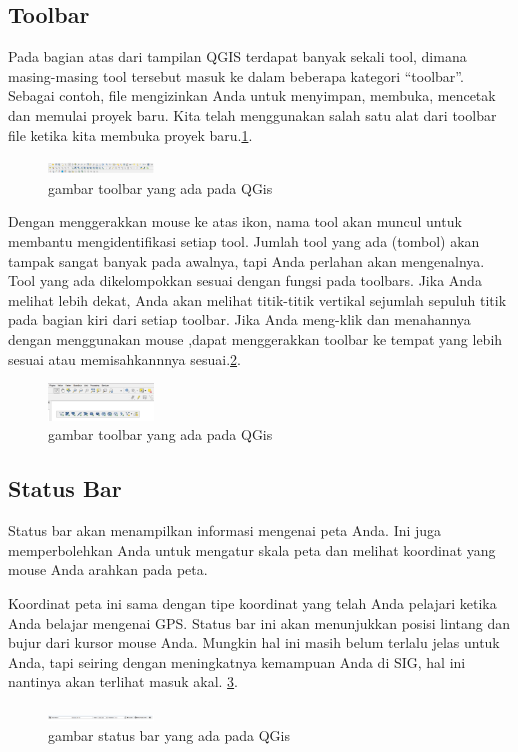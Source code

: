 \subsection{Toolbar}
Pada bagian atas dari tampilan QGIS terdapat banyak sekali tool, dimana masing-masing tool tersebut masuk ke dalam beberapa kategori “toolbar”. Sebagai contoh,  file mengizinkan Anda untuk menyimpan, membuka, mencetak dan memulai proyek baru. Kita telah menggunakan salah satu alat dari toolbar file ketika kita membuka proyek baru.\ref{toolbar}.
\begin{figure}[ht]
    \centerline{\includegraphics[width=0.25\textwidth]{figures/toolbar.png}}
    \caption{gambar toolbar yang ada pada QGis}
    \label{toolbar}
    \end{figure}

Dengan menggerakkan mouse ke atas ikon, nama tool akan muncul untuk membantu mengidentifikasi setiap tool. Jumlah tool yang ada (tombol) akan tampak sangat banyak pada awalnya, tapi Anda perlahan akan mengenalnya. Tool yang ada dikelompokkan sesuai dengan fungsi pada toolbars. Jika Anda melihat lebih dekat, Anda akan melihat titik-titik vertikal sejumlah sepuluh titik pada bagian kiri dari setiap toolbar. Jika Anda meng-klik dan menahannya dengan menggunakan mouse ,dapat menggerakkan toolbar ke tempat yang lebih sesuai atau memisahkannnya sesuai.\ref{toolbar1}.
\begin{figure}[ht]
    \centerline{\includegraphics[width=0.25\textwidth]{figures/toolbar1.png}}
    \caption{gambar toolbar yang ada pada QGis}
    \label{toolbar1}
    \end{figure}
    
\subsection{Status Bar}
Status bar akan menampilkan informasi mengenai peta Anda. Ini juga memperbolehkan Anda untuk mengatur skala peta dan melihat koordinat yang mouse Anda arahkan pada peta.

Koordinat peta ini sama dengan tipe koordinat yang telah Anda pelajari ketika Anda belajar mengenai GPS. Status bar ini akan menunjukkan posisi lintang dan bujur dari kursor mouse Anda.
Mungkin hal ini masih belum terlalu jelas untuk Anda, tapi seiring dengan meningkatnya kemampuan Anda di SIG, hal ini nantinya akan terlihat masuk akal. \ref{statbar}.
\begin{figure}[ht]
    \centerline{\includegraphics[width=0.25\textwidth]{figures/statbar.png}}
    \caption{gambar status bar yang ada pada QGis}
    \label{statbar}
    \end{figure}

